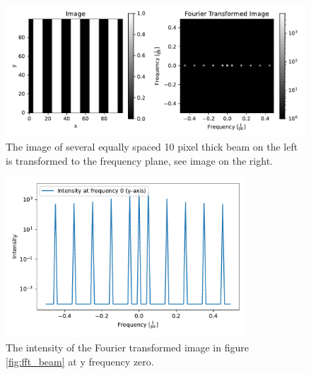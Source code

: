\begin{figure}[H]
	\centering
		\includegraphics[width=1.0\textwidth]{pics/fft_simulationmorebeams.pdf}
		\caption{The image of several equally spaced 10 pixel thick beam on the left is transformed to the frequency plane, see image on the right.}
		\label{fig:fft_beams}
\end{figure}
\begin{figure}[H]
	\centering
		\includegraphics[width=0.8\textwidth]{pics/fft_simulation_cutmorebeams.pdf}
		\caption{The intensity of the Fourier transformed image in figure \ref{fig:fft_beam} at y frequency zero.}
		\label{fig:fft_beams_cut}
\end{figure}

